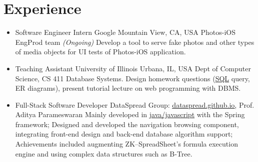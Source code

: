 \documentclass[11pt,a4paper,sans]{moderncv}        %
\begin{document}
\section{Experience}
\begin{itemize}
	
	\item{
	      {Software Engineer Intern}
	      {Google}
	      {Mountain View, CA, USA}
	      {Photos-iOS EngProd team}
	      {\emph{(Ongoing)} Develop a tool to serve fake photos and other types of media objects for UI tests of Photos-iOS application.}
	      }
	      
	
	\item{
	      {Teaching Assistant}
	      {University of Illinois}
	      {Urbana, IL, USA}
	      {Dept of Computer Science, CS 411 Database Systems.}
	      {Design homework questions (\underline{SQL} query, ER diagrams), present tutorial lecture on web programming with DBMS.}
	      }
	      
	\item{
	      {Full-Stack Software Developer}
	      {\vspace{-10pt}}
	      {}
	      {DataSpread Group:
		      \href{https://dataspread.github.io}{\underline{dataspread.github.io}}, Prof. Aditya Parameswaran}
	      {
		      Mainly developed in \underline{java/javascript} with the Spring framework;
		      Designed and developed the navigation browsing component, integrating front-end design and back-end database algorithm support;
		      Achievements included augmenting ZK--SpreadSheet's formula execution engine and using complex data structures such as B-Tree.}
	      }
	      
	      

\end{itemize}
\end{document}
